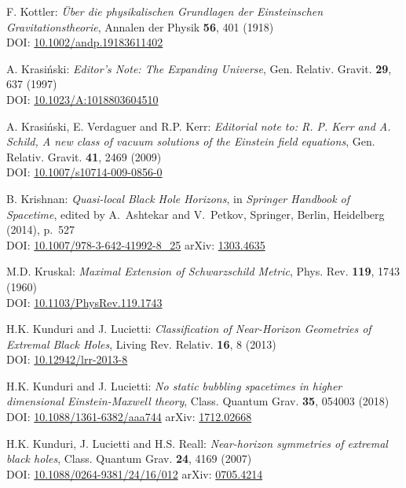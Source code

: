 \begin{thebibliography}{123}
F.  Kottler:
{\em \"Uber die physikalischen Grundlagen der Einsteinschen Gravitationstheorie},
Annalen der Physik {\bf 56}, 401 (1918)\\
DOI: \href{https://doi.org/10.1002/andp.19183611402}{10.1002/andp.19183611402}

A. Krasi\'nski:
{\em Editor's Note: The Expanding Universe},
Gen. Relativ. Gravit. {\bf 29}, 637 (1997)\\
DOI: \href{https://doi.org/10.1023/A:1018803604510}{10.1023/A:1018803604510}

A. Krasi\'nski, E. Verdaguer and R.P. Kerr:
{\em Editorial note to: R. P. Kerr and A. Schild, A new class of vacuum solutions of the Einstein field equations},
Gen. Relativ. Gravit. {\bf 41}, 2469 (2009)\\
DOI: \href{https://doi.org/10.1007/s10714-009-0856-0}{10.1007/s10714-009-0856-0}

B. Krishnan:
{\em Quasi-local Black Hole Horizons},
in {\em Springer Handbook of Spacetime}, edited by A.~Ashtekar and V.~Petkov,
Springer, Berlin, Heidelberg (2014), p.~527\\
DOI: \href{https://doi.org/10.1007/978-3-642-41992-8_25}{10.1007/978-3-642-41992-8\_25}\hfill
arXiv: \href{https://arxiv.org/abs/1303.4635}{1303.4635}

M.D. Kruskal:
{\em Maximal Extension of Schwarzschild Metric},
Phys. Rev. {\bf 119}, 1743 (1960)\\
DOI: \href{https://doi.org/10.1103/PhysRev.119.1743}{10.1103/PhysRev.119.1743}

H.K. Kunduri and J. Lucietti:
{\em Classification of Near-Horizon Geometries of Extremal Black Holes},
Living Rev. Relativ. {\bf 16}, 8 (2013)\\
DOI: \href{https://doi.org/10.12942/lrr-2013-8}{10.12942/lrr-2013-8}

H.K. Kunduri and J. Lucietti:
{\em No static bubbling spacetimes in higher dimensional Einstein-Maxwell theory},
Class. Quantum Grav. {\bf 35}, 054003 (2018)\\
DOI: \href{https://doi.org/10.1088/1361-6382/aaa744}{10.1088/1361-6382/aaa744}\hfill
arXiv: \href{https://arxiv.org/abs/1712.02668}{1712.02668}

H.K. Kunduri, J. Lucietti and H.S. Reall:
{\em Near-horizon symmetries of extremal black holes},
Class. Quantum Grav. {\bf 24}, 4169 (2007)\\
DOI: \href{https://doi.org/10.1088/0264-9381/24/16/012}{10.1088/0264-9381/24/16/012}\hfill
arXiv: \href{https://arxiv.org/abs/0705.4214}{0705.4214}


\end{thebibliography}
